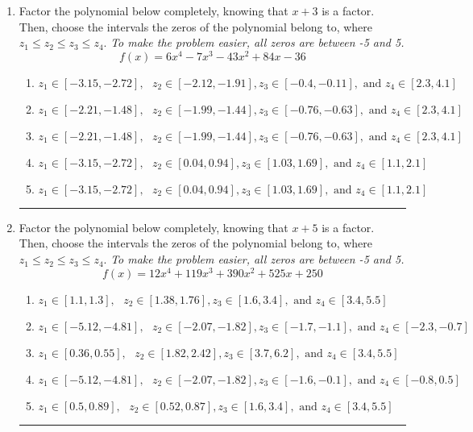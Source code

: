 \documentclass[14pt]{extbook}
\newcommand{\litem}[1]{\item#1\hspace*{-1cm}\rule{\textwidth}{0.4pt}}
\begin{document}
\begin{enumerate}
{\begin{enumerate}[label=\Alph*.]
\end{enumerate} }
\litem{
Factor the polynomial below completely, knowing that $x+3$ is a factor. Then, choose the intervals the zeros of the polynomial belong to, where $z_1 \leq z_2 \leq z_3 \leq z_4$. \textit{To make the problem easier, all zeros are between -5 and 5.}\[ f(x) = 6x^{4} -7 x^{3} -43 x^{2} +84 x -36 \]\begin{enumerate}[label=\Alph*.]
\item \( z_1 \in [-3.15, -2.72], \text{   }  z_2 \in [-2.12, -1.91], z_3 \in [-0.4, -0.11], \text{   and   } z_4 \in [2.3, 4.1] \)
\item \( z_1 \in [-2.21, -1.48], \text{   }  z_2 \in [-1.99, -1.44], z_3 \in [-0.76, -0.63], \text{   and   } z_4 \in [2.3, 4.1] \)
\item \( z_1 \in [-2.21, -1.48], \text{   }  z_2 \in [-1.99, -1.44], z_3 \in [-0.76, -0.63], \text{   and   } z_4 \in [2.3, 4.1] \)
\item \( z_1 \in [-3.15, -2.72], \text{   }  z_2 \in [0.04, 0.94], z_3 \in [1.03, 1.69], \text{   and   } z_4 \in [1.1, 2.1] \)
\item \( z_1 \in [-3.15, -2.72], \text{   }  z_2 \in [0.04, 0.94], z_3 \in [1.03, 1.69], \text{   and   } z_4 \in [1.1, 2.1] \)

\end{enumerate} }
\litem{
Factor the polynomial below completely, knowing that $x+5$ is a factor. Then, choose the intervals the zeros of the polynomial belong to, where $z_1 \leq z_2 \leq z_3 \leq z_4$. \textit{To make the problem easier, all zeros are between -5 and 5.}\[ f(x) = 12x^{4} +119 x^{3} +390 x^{2} +525 x + 250 \]\begin{enumerate}[label=\Alph*.]
\item \( z_1 \in [1.1, 1.3], \text{   }  z_2 \in [1.38, 1.76], z_3 \in [1.6, 3.4], \text{   and   } z_4 \in [3.4, 5.5] \)
\item \( z_1 \in [-5.12, -4.81], \text{   }  z_2 \in [-2.07, -1.82], z_3 \in [-1.7, -1.1], \text{   and   } z_4 \in [-2.3, -0.7] \)
\item \( z_1 \in [0.36, 0.55], \text{   }  z_2 \in [1.82, 2.42], z_3 \in [3.7, 6.2], \text{   and   } z_4 \in [3.4, 5.5] \)
\item \( z_1 \in [-5.12, -4.81], \text{   }  z_2 \in [-2.07, -1.82], z_3 \in [-1.6, -0.1], \text{   and   } z_4 \in [-0.8, 0.5] \)
\item \( z_1 \in [0.5, 0.89], \text{   }  z_2 \in [0.52, 0.87], z_3 \in [1.6, 3.4], \text{   and   } z_4 \in [3.4, 5.5] \)


\end{enumerate}}
\end{enumerate}
\end{document}
